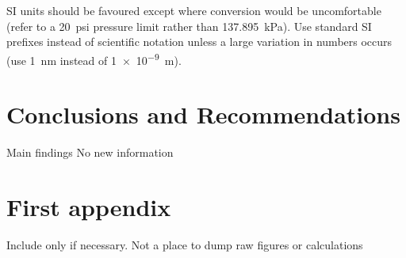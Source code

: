 \documentclass[a4paper,12pt]{article}
\begin{document}
SI units should be favoured except where conversion would be
uncomfortable (refer to a \SI{20}{psi} pressure limit rather than
\SI{137.895}{\kilo\pascal}).
Use standard
SI prefixes instead of scientific notation unless a large variation in
numbers occurs (use \SI{1}{\nano\meter} instead of \SI{1e-9}{\meter}).

\section{Conclusions and Recommendations}
Main findings
No new information




\appendix
\renewcommand{\thefigure}{\thesection.\arabic{figure}}
\renewcommand{\thepage}{\thesection.\arabic{page}}
\section{First appendix}
\setcounter{figure}{0}
\setcounter{page}{1}
Include only if necessary. Not a place to dump raw figures or calculations
\end{document}
